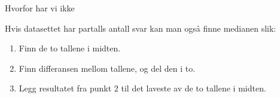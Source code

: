 



\opgt
\nes
{}
Hvorfor har vi ikke

Hvis datasettet har partalls antall svar kan man også finne medianen slik:
\begin{enumerate}
	\item Finn de to tallene i midten.
	\item Finn differansen mellom tallene, og del den i to.
	\item Legg resultatet fra punkt 2 til det laveste av de to tallene i midten.
\end{enumerate}



